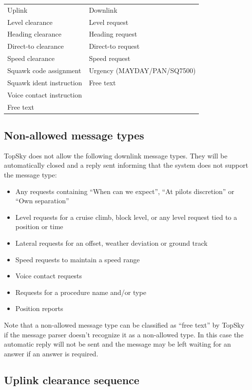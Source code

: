 \documentclass[11pt,a4paper]{memoir}
\begin{document}
\begin{tabular}{l l}
  Uplink                      & Downlink\\
  Level clearance             & Level request\\
  Heading clearance           & Heading request\\
  Direct-to clearance         & Direct-to request\\
  Speed clearance             & Speed request\\
  Squawk code assignment      & Urgency (MAYDAY/PAN/SQ7500)\\
  Squawk ident instruction    & Free text\\
  Voice contact instruction   & \\
  Free text                   & \\
\end{tabular}

\subsection{Non-allowed message types}
\label{cpdlc:nmt}

TopSky does not allow the following downlink message types. They will be automatically closed and a reply sent informing that the system does not support the message type:

\begin{itemize}
  \item Any requests containing “When can we expect”, “At pilots discretion” or “Own separation”
  \item Level requests for a cruise climb, block level, or any level request tied to a position or time
  \item Lateral requests for an offset, weather deviation or ground track
  \item Speed requests to maintain a speed range
  \item Voice contact requests
  \item Requests for a procedure name and/or type
  \item Position reports
\end{itemize}

Note that a non-allowed message type can be classified as “free text” by TopSky if the message parser doesn’t recognize it as a non-allowed type. In this case the automatic reply will not be sent and the message may be left waiting for an answer if an answer is required.

\subsection{Uplink clearance sequence}
\label{cpdlc:ucs}
\end{document}

